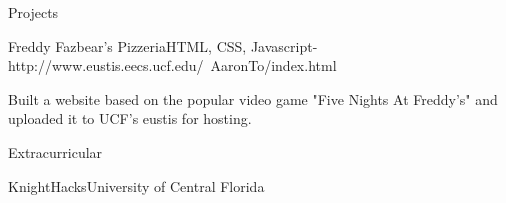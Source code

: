 \documentclass{resume} %
\begin{document}
\begin{rSection}{Projects}
\begin{rSubsection}{Freddy Fazbear's Pizzeria}{}{HTML, CSS, Javascript-http://www.eustis.eecs.ucf.edu/~AaronTo/index.html}{} 
        \item[] Built a website based on the popular video game "Five Nights At Freddy's" and uploaded it to UCF's eustis for hosting.
    \end{rSubsection}
\end{rSection}

\begin{rSection}{Extracurricular}
    \begin{rSubsection}{KnightHacks}{}{University of Central Florida}{}
    	\item[]
    \end{rSubsection}
\end{rSection}
\end{document}
